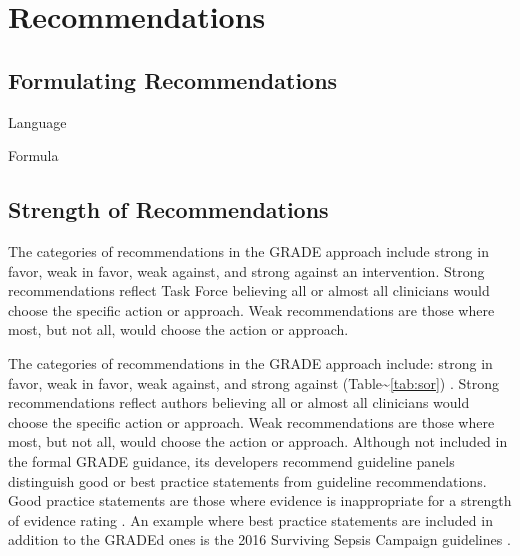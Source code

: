 \documentclass[
  letterpaper,
  DIV=11,
  numbers=noendperiod]{scrreprt}
\begin{document}

\hypertarget{recommendations}{%
\chapter{Recommendations}\label{recommendations}}

\hypertarget{formulating-recommendations}{%
\section{Formulating
Recommendations}\label{formulating-recommendations}}

Language

Formula

\hypertarget{strength-of-recommendations}{%
\section{Strength of
Recommendations}\label{strength-of-recommendations}}

The categories of recommendations in the GRADE approach include strong
in favor, weak in favor, weak against, and strong against an
intervention. Strong recommendations reflect Task Force believing all or
almost all clinicians would choose the specific action or approach. Weak
recommendations are those where most, but not all, would choose the
action or approach.

The categories of recommendations in the GRADE approach include: strong
in favor, weak in favor, weak against, and strong against
(Table\textasciitilde{}\ref{tab:sor}) \cite{Andrews2013}. Strong
recommendations reflect authors believing all or almost all clinicians
would choose the specific action or approach. Weak recommendations are
those where most, but not all, would choose the action or approach.
Although not included in the formal GRADE guidance, its developers
recommend guideline panels distinguish good or best practice statements
from guideline recommendations. Good practice statements are those where
evidence is inappropriate for a strength of evidence rating
\cite{Guyatt2015,Guyatt2016}. An example where best practice statements
are included in addition to the GRADEd ones is the 2016 Surviving Sepsis
Campaign guidelines \cite{Rhodes2017}.
\end{document}

